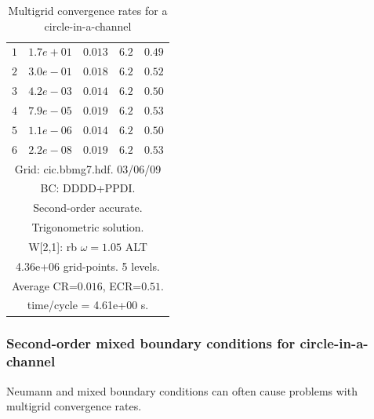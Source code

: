 \begin{table}[hbt]
\begin{center}
{\begin{tabular}{|c|c|c|c|c|}
 $ 1$  & $ 1.7e+01$ & $0.013$ & $ 6.2$ & $0.49$ \\ 
 $ 2$  & $ 3.0e-01$ & $0.018$ & $ 6.2$ & $0.52$ \\ 
 $ 3$  & $ 4.2e-03$ & $0.014$ & $ 6.2$ & $0.50$ \\ 
 $ 4$  & $ 7.9e-05$ & $0.019$ & $ 6.2$ & $0.53$ \\ 
 $ 5$  & $ 1.1e-06$ & $0.014$ & $ 6.2$ & $0.50$ \\ 
 $ 6$  & $ 2.2e-08$ & $0.019$ & $ 6.2$ & $0.53$ \\ 
\hline 
\multicolumn{5}{|c|}{Grid: cic.bbmg7.hdf. 03/06/09}  \\
\multicolumn{5}{|c|}{BC: DDDD+PPDI.}  \\
\multicolumn{5}{|c|}{Second-order accurate.}  \\
\multicolumn{5}{|c|}{Trigonometric solution.}  \\
\multicolumn{5}{|c|}{W[2,1]: rb $\omega=1.05$ ALT}  \\
\multicolumn{5}{|c|}{4.36e+06 grid-points. 5 levels.}  \\
\multicolumn{5}{|c|}{Average CR=$0.016$, ECR=$0.51$.}  \\
\multicolumn{5}{|c|}{time/cycle = 4.61e+00 s.}  \\
\hline 
\end{tabular}
} %
\end{center}
\caption{Multigrid convergence rates for a circle-in-a-channel}
 \label{tab:cicNeumann} 
\end{table}

\clearpage
\subsubsection{Second-order mixed boundary conditions for circle-in-a-channel}

Neumann and mixed boundary conditions can often cause problems with multigrid
convergence rates.


